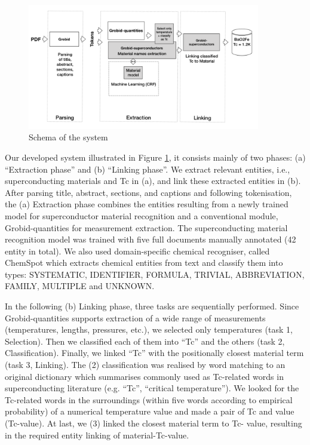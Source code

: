 \documentclass{article}[a4]
\begin{document}
\begin{figure}[]
    \centering
    \includegraphics[width=4in]{schema}
    \caption[Schema of the system] {Schema of the system}
    \label{fig:system-schema}
\end{figure}

Our developed system illustrated in Figure \ref{fig:system-schema}, it consists mainly of two phases: (a) “Extraction phase” and (b) “Linking phase”. We extract relevant entities, i.e., superconducting materials and Tc in (a), and link these extracted entities in (b). After parsing title, abstract, sections, and captions and following tokenisation, the (a) Extraction phase combines the entities resulting from a newly trained model for superconductor material recognition and a conventional module, Grobid-quantities for measurement extraction. The superconducting material recognition model was trained with five full documents manually annotated (42 entity in total). We also used domain-specific chemical recogniser, called ChemSpot \cite{10.1093/bioinformatics/bts183} which extracts chemical entities from text and classify them into types: SYSTEMATIC, IDENTIFIER, FORMULA, TRIVIAL, ABBREVIATION, FAMILY, MULTIPLE and UNKNOWN.

In the following (b) Linking phase, three tasks are sequentially performed. Since Grobid-quantities supports extraction of a wide range of measurements (temperatures, lengths, pressures, etc.), we selected only temperatures (task 1, Selection). Then we classified each of them into “Tc” and the others (task 2, Classification). Finally, we linked “Tc” with the positionally closest material term (task 3, Linking). The (2) classification was realised by word matching to an original dictionary which summarises commonly used as Tc-related words in superconducting literature (e.g. “Tc”, “critical temperature”). We looked for the Tc-related words in the surroundings (within five words according to empirical probability) of a numerical temperature value and made a pair of Tc and value (Tc-value). At last, we (3) linked the closest material term to Tc- value, resulting in the required entity linking of material-Tc-value.
\end{document}
